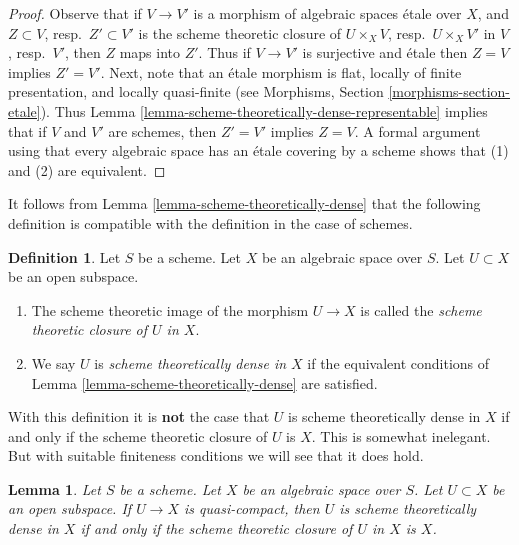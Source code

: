 \documentclass{stacks-project}
\theoremstyle{plain}
\newtheorem{lemma}[subsection]{Lemma}
\theoremstyle{definition}
\newtheorem{definition}[subsection]{Definition}
\theoremstyle{remark}
\numberwithin{equation}{subsection}
\begin{document}
\begin{proof}
Observe that if $V \to V'$ is a morphism of algebraic spaces \'etale
over $X$, and $Z \subset V$, resp.\ $Z' \subset V'$ is the scheme theoretic
closure of $U \times_X V$, resp.\ $U \times_X V'$ in $V$, resp.\ $V'$,
then $Z$ maps into $Z'$. Thus if $V \to V'$ is surjective and \'etale
then $Z = V$ implies $Z' = V'$. Next, note that an \'etale morphism is
flat, locally of finite presentation, and locally quasi-finite
(see Morphisms, Section \ref{morphisms-section-etale}).
Thus Lemma \ref{lemma-scheme-theoretically-dense-representable}
implies that if $V$ and $V'$ are schemes, then $Z' = V'$ implies
$Z = V$. A formal argument using that every algebraic space has an
\'etale covering by a scheme shows that (1) and (2) are equivalent.
\end{proof}

\noindent
It follows from
Lemma \ref{lemma-scheme-theoretically-dense}
that the following definition is compatible with the definition
in the case of schemes.

\begin{definition}
\label{definition-scheme-theoretically-dense}
Let $S$ be a scheme.
Let $X$ be an algebraic space over $S$.
Let $U \subset X$ be an open subspace.
\begin{enumerate}
\item The scheme theoretic image of the morphism $U \to X$
is called the {\it scheme theoretic closure of $U$ in $X$}.
\item We say $U$ is {\it scheme theoretically dense in $X$}
if the equivalent conditions of
Lemma \ref{lemma-scheme-theoretically-dense} are satisfied.
\end{enumerate}
\end{definition}

\noindent
With this definition it is {\bf not} the case that $U$ is scheme
theoretically dense in $X$ if and only if the scheme theoretic closure
of $U$ is $X$. This is somewhat inelegant. But with suitable
finiteness conditions we will see that it does hold.

\begin{lemma}
\label{lemma-scheme-theoretically-dense-quasi-compact}
Let $S$ be a scheme. Let $X$ be an algebraic space over $S$.
Let $U \subset X$ be an open subspace.
If $U \to X$ is quasi-compact, then $U$
is scheme theoretically dense in $X$ if and only if the scheme theoretic
closure of $U$ in $X$ is $X$.
\end{lemma}
\end{document}
